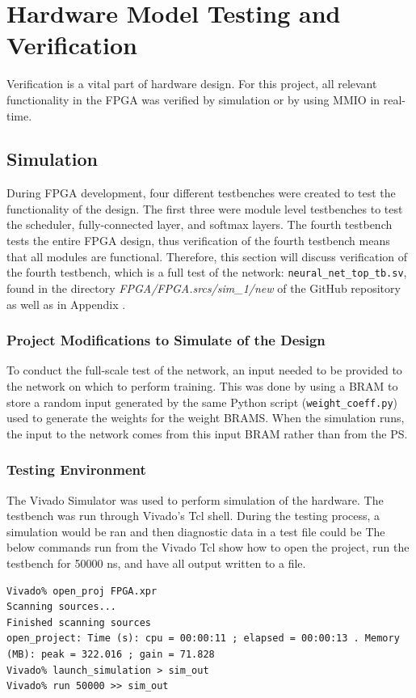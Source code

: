 \chapter{Hardware Model Testing and Verification}
Verification is a vital part of hardware design. For this project, all relevant functionality in the FPGA was verified by simulation or by using MMIO in real-time.
\section{Simulation}
During FPGA development, four different testbenches were created to test the functionality of the design. The first three were module level testbenches to test the scheduler, fully-connected layer, and softmax layers. The fourth testbench tests the entire FPGA design, thus verification of the fourth testbench means that all modules are functional. Therefore, this section will discuss verification of the fourth testbench, which is a full test of the network: \texttt{neural\_net\_top\_tb.sv}, found in the directory \textit{FPGA/FPGA.srcs/sim\_1/new} of the GitHub repository as well as in Appendix .

\subsection{Project Modifications to Simulate of the Design}
To conduct the full-scale test of the network, an input needed to be provided to the network on which to perform training. This was done by using a BRAM to store a random input generated by the same Python script (\texttt{weight\_coeff.py}) used to generate the weights for the weight BRAMS. When the simulation runs, the input to the network comes from this input BRAM rather than from the PS.

\subsection{Testing Environment}
The Vivado Simulator was used to perform simulation of the hardware. The testbench was run through Vivado's Tcl shell. During the testing process, a simulation would be ran and then diagnostic data in a test file could be  The below commands run from the Vivado Tcl show how to open the project, run the testbench for 50000 ns, and have all output written to a file.
\begin{lstlisting}
Vivado% open_proj FPGA.xpr
Scanning sources...
Finished scanning sources
open_project: Time (s): cpu = 00:00:11 ; elapsed = 00:00:13 . Memory (MB): peak = 322.016 ; gain = 71.828
Vivado% launch_simulation > sim_out
Vivado% run 50000 >> sim_out
\end{lstlisting}

